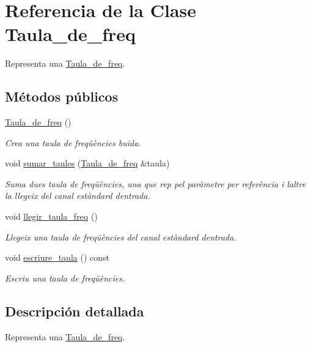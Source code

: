 \hypertarget{class_taula__de__freq}{}\section{Referencia de la Clase Taula\+\_\+de\+\_\+freq}
\label{class_taula__de__freq}


Representa una \hyperlink{class_taula__de__freq}{Taula\+\_\+de\+\_\+freq}.  


\subsection*{Métodos públicos}
\begin{DoxyCompactItemize}
\item 
\hyperlink{class_taula__de__freq_a57b8d780af285f09746da0a96dfd9d61}{Taula\+\_\+de\+\_\+freq} ()
\begin{DoxyCompactList}\small\item\em Crea una taula de freqüències buida. \end{DoxyCompactList}\item 
void \hyperlink{class_taula__de__freq_a477d0c004880c24ecff3f477ba2d8e61}{sumar\+\_\+taules} (\hyperlink{class_taula__de__freq}{Taula\+\_\+de\+\_\+freq} \&taula)
\begin{DoxyCompactList}\small\item\em Suma dues taula de freqüències, una que rep pel paràmetre per referència i l\textquotesingle{}altre la llegeix del canal estàndard d\textquotesingle{}entrada. \end{DoxyCompactList}\item 
void \hyperlink{class_taula__de__freq_a6e3d7bfaa7227f9b7603864c7a3da2cf}{llegir\+\_\+taula\+\_\+freq} ()
\begin{DoxyCompactList}\small\item\em Llegeix una taula de freqüències del canal estàndard d\textquotesingle{}entrada. \end{DoxyCompactList}\item 
void \hyperlink{class_taula__de__freq_a2b32d909aea13d0e4837faf4b439f181}{escriure\+\_\+taula} () const
\begin{DoxyCompactList}\small\item\em Escriu una taula de freqüències. \end{DoxyCompactList}\end{DoxyCompactItemize}


\subsection{Descripción detallada}
Representa una \hyperlink{class_taula__de__freq}{Taula\+\_\+de\+\_\+freq}. 

